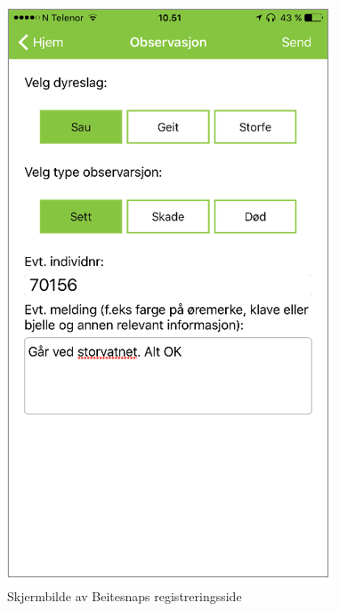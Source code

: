 \begin{figure}[H]
\centering
\captionsetup{width=.8\linewidth}
\includegraphics[scale=0.7]{Figurer/Bilder/beitesnap.png}
\caption{Skjermbilde av Beitesnaps registreringsside}
\label{fig:beitesnap}
\end{figure}

